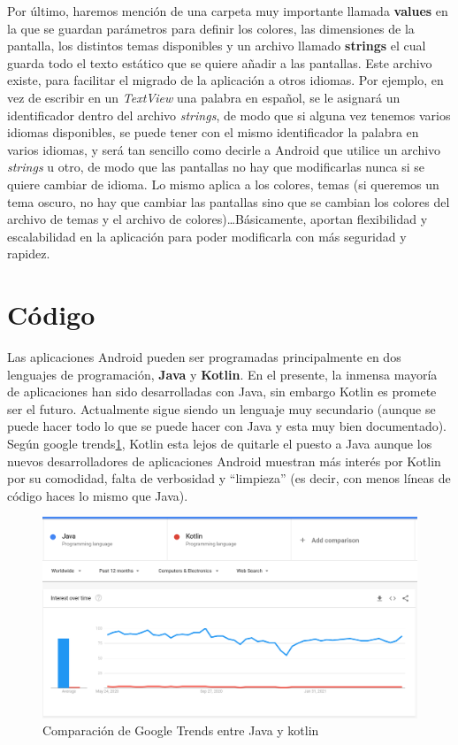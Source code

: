Por último, haremos mención de una carpeta muy importante llamada \textbf{values} en la que se guardan parámetros para definir los colores, las dimensiones de la pantalla, los distintos temas disponibles y un archivo llamado \textbf{strings} el cual guarda todo el texto estático que se quiere añadir a las pantallas. Este archivo existe, para facilitar el migrado de la aplicación a otros idiomas. Por ejemplo, en vez de escribir en un \textit{TextView} una palabra en español, se le asignará un identificador dentro del archivo \emph{strings}, de modo que si alguna vez tenemos varios idiomas disponibles, se puede tener con el mismo identificador la palabra en varios idiomas, y será tan sencillo como decirle a Android que utilice un archivo \emph{strings} u otro, de modo que las pantallas no hay que modificarlas nunca si se quiere cambiar de idioma. Lo mismo aplica a los colores, temas (si queremos un tema oscuro, no hay que cambiar las pantallas sino que se cambian los colores del archivo de temas y el archivo de colores)\dots Básicamente, aportan flexibilidad y escalabilidad en la aplicación para poder modificarla con más seguridad y rapidez. 




\section{Código} \label{sec:Codigo}

Las aplicaciones Android pueden ser programadas principalmente en dos lenguajes de programación, \textbf{Java} y \textbf{Kotlin}. En el presente, la inmensa mayoría de aplicaciones han sido desarrolladas con Java, sin embargo Kotlin es promete ser el futuro. Actualmente sigue siendo un lenguaje muy secundario (aunque se puede hacer todo lo que se puede hacer con Java y esta muy bien documentado). Según google trends\ref{fig:java_vs_kotlin}, Kotlin esta lejos de quitarle el puesto a Java aunque los nuevos desarrolladores de aplicaciones Android muestran más interés por Kotlin por su comodidad, falta de verbosidad y ``limpieza'' (es decir, con menos líneas de código haces lo mismo que Java). 

\begin{figure}[h!]
  \centering
  \includegraphics[width=0.9\linewidth]{figs/Desarrollo/Popularidad}
  \caption[Java vs Kotlin]{Comparación de Google Trends entre Java y kotlin}
  \label{fig:java_vs_kotlin}
\end{figure}

